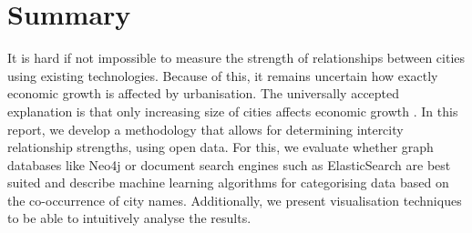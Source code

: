 \newpage

\chapter*{Summary}




It is hard if not impossible to measure the strength of relationships between cities using existing technologies. Because of this, it remains uncertain how exactly economic growth is affected by urbanisation. The universally accepted explanation is that only increasing size of cities affects economic growth \cite{porter2000location}. In this report, we develop a methodology that allows for determining intercity relationship strengths, using open data. For this, we evaluate whether graph databases like Neo4j \cite{neo4j} or document search engines such as ElasticSearch \cite{elasticsearch} are best suited and describe machine learning algorithms for categorising data based on the co-occurrence of city names. Additionally, we present visualisation techniques to be able to intuitively analyse the results. 


